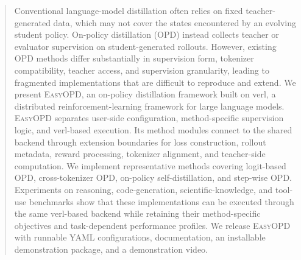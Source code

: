 \begin{abstract}
Conventional language-model distillation often relies on fixed teacher-generated data, which may not cover the states encountered by an evolving student policy.
On-policy distillation (OPD) instead collects teacher or evaluator supervision on student-generated rollouts.
However, existing OPD methods differ substantially in supervision form, tokenizer compatibility, teacher access, and supervision granularity, leading to fragmented implementations that are difficult to reproduce and extend.
We present \textsc{EasyOPD}, an on-policy distillation framework built on verl, a distributed reinforcement-learning framework for large language models.
\textsc{EasyOPD} separates user-side configuration, method-specific supervision logic, and verl-based execution.
Its method modules connect to the shared backend through extension boundaries for loss construction, rollout metadata, reward processing, tokenizer alignment, and teacher-side computation.
We implement representative methods covering logit-based OPD, cross-tokenizer OPD, on-policy self-distillation, and step-wise OPD.
Experiments on reasoning, code-generation, scientific-knowledge, and tool-use benchmarks show that these implementations can be executed through the same verl-based backend while retaining their method-specific objectives and task-dependent performance profiles.
We release \textsc{EasyOPD} with runnable YAML configurations, documentation, an installable demonstration package, and a demonstration video.

\end{abstract}
